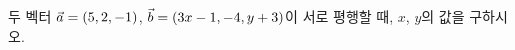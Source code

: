 두 벡터 $\vec{a}=(5{,}\mkern3mu\mathopen{}2{,}\mkern3mu\mathopen{}-1)$, $\vec{b}=(3x-1{,}\mkern3mu\mathopen{}-4{,}\mkern3mu\mathopen{}y+3)$이 서로 평행할 때, $x$, $y$의 값을 구하시오.
